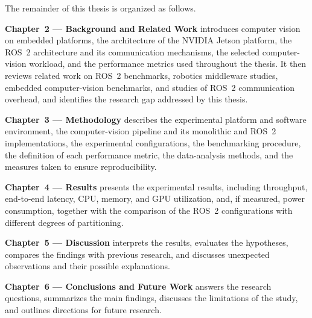 The remainder of this thesis is organized as follows.

\textbf{Chapter~2 --- Background and Related Work} introduces computer
vision on embedded platforms, the architecture of the NVIDIA Jetson
platform, the ROS~2 architecture and its communication mechanisms, the
selected computer-vision workload, and the performance metrics used
throughout the thesis. It then reviews related work on ROS~2 benchmarks,
robotics middleware studies, embedded computer-vision benchmarks, and
studies of ROS~2 communication overhead, and identifies the research gap
addressed by this thesis.

\textbf{Chapter~3 --- Methodology} describes the experimental platform and
software environment, the computer-vision pipeline and its monolithic and
ROS~2 implementations, the experimental configurations, the benchmarking
procedure, the definition of each performance metric, the data-analysis
methods, and the measures taken to ensure reproducibility.

\textbf{Chapter~4 --- Results} presents the experimental results, including
throughput, end-to-end latency, CPU, memory, and GPU utilization, and, if
measured, power consumption, together with the comparison of the ROS~2
configurations with different degrees of partitioning.

\textbf{Chapter~5 --- Discussion} interprets the results, evaluates the
hypotheses, compares the findings with previous research, and discusses
unexpected observations and their possible explanations.

\textbf{Chapter~6 --- Conclusions and Future Work} answers the research
questions, summarizes the main findings, discusses the limitations of the
study, and outlines directions for future research.
